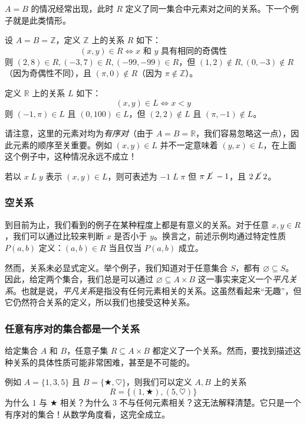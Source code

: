 $A = B$ 的情况经常出现，此时 $R$ 定义了同一集合中元素对之间的关系。下一个例子就是此类情形。

\begin{example} \label{ex:example6.2.5}
    设 $A=B=\mathbb{Z}$，定义 $\mathbb{Z}$ 上的关系 $R$ 如下：
    \[(x, y) \in R \iff x \text{\ 和\ } y \text{\ 具有相同的奇偶性}\]
    则 $(2,8) \in R, (-3, 7) \in R, (-99, -99) \in R$，但 $(1,2) \notin R, (0, -3) \notin R$（因为奇偶性不同），且 $(\pi, 0) \notin R$（因为 $\pi \notin \mathbb{Z}$）。
\end{example}

\begin{example} \label{ex:example6.2.6}
    定义 $\mathbb{R}$ 上的关系 $L$ 如下：
    \[(x, y) \in L \iff x < y\]
    则 $(-1, \pi) \in L$ 且 $(0, 100) \in L$，但 $(2, 2) \notin L$ 且 $(\pi, -1) \notin L$。
\end{example}

请注意，这里的元素对均为\emph{有序对}（由于 $A = B = \mathbb{R}$，我们容易忽略这一点），因此元素的顺序至关重要。例如 $(x, y) \in L$ 并不一定意味着 $(y, x) \in L$，在上面这个例子中，这种情况永远不成立！

若以 $x \;L\; y$ 表示 $(x, y) \in L$，则可表述为 $-1 \;L\; \pi$ 但 $\pi \;\cancel{L}\; -1$，且 $2 \;\cancel{L}\; 2$。

\subsubsection*{空关系}

\begin{remark}
    到目前为止，我们看到的例子在某种程度上都是有意义的关系。对于任意 $x,y \in R$，我们可以通过比较来判断 $x$ 是否小于 $y$。换言之，前述示例均通过特定性质 $P(a,b)$ 定义：$(a, b) \in R$ 当且仅当 $P(a,b)$ 成立。
\end{remark}

然而，关系未必显式定义。举个例子，我们知道对于任意集合 $S$，都有 $\varnothing \subseteq S$。因此，给定两个集合，我们总是可以通过 $\varnothing \subseteq A \times B$ 这一事实来定义一个\emph{平凡关系}。也就是说，\emph{平凡关系}是指没有任何元素相关的关系。这虽然看起来``无趣''，但它仍然符合关系的定义，所以我们也接受这种关系。

\subsubsection*{任意有序对的集合都是一个关系}

\begin{remark}
    给定集合 $A$ 和 $B$，任意子集 $R \subseteq A \times B$ 都定义了一个关系。然而，要找到描述这种关系的具体性质可能非常困难，甚至是不可能的。

    例如 $A=\{1,3,5\}$ 且 $B=\{\bigstar, \heartsuit\}$，则我们可以定义 $A, B$ 上的关系
    \[R=\{(1,\bigstar), (5, \heartsuit)\}\]
    为什么 $1$ 与 $\bigstar$ 相关？为什么 $3$ 不与任何元素相关？这无法解释清楚。它只是一个有序对的集合！从数学角度看，这完全成立。
\end{remark}

